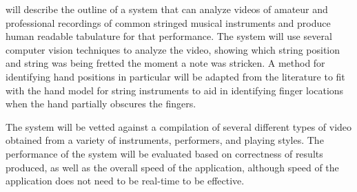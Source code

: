 will describe the outline of a system that can analyze videos
of amateur and professional recordings of common stringed musical instruments and
produce human readable tabulature for that performance.
The system will use several computer vision techniques to analyze the video,
showing which string position and string was being fretted the moment a note was stricken.
A method for identifying hand positions in particular will be adapted from the literature
to fit with the hand model for string instruments to aid in identifying finger locations
when the hand partially obscures the fingers.
\par
The system will be vetted against a compilation of several different types of video
obtained from a variety of instruments, performers, and playing styles.
The performance of the system will be evaluated based on correctness of results produced,
as well as the overall speed of the application, although speed of the application does not need to be real-time to be effective.
